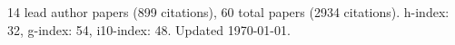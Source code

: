 14 lead author papers (899 citations),
60 total papers (2934 citations).\newline
h-index: 32, g-index: 54, i10-index: 48. Updated \today.
